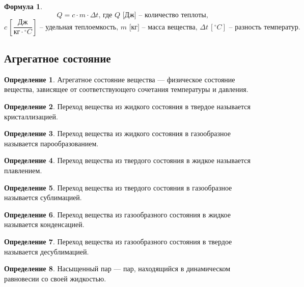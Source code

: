 \documentclass[12pt]{article}
\theoremstyle{definition}
\newtheorem{definition}{Определение}
\newtheorem{formula}[theorem]{Формула}
\begin{document}
\begin{formula}
    $$Q=c\cdot m\cdot \Delta t\text{, где }Q\text{ [Дж] – количество теплоты,}$$
$$c\,\left[\frac{\text{Дж}}{\text{кг}\cdot {^\circ C}}\right]\text{ – удельная теплоемкость, }m\text{ [кг] – масса вещества, }\Delta t\,[^\circ C]\text{ – разность температур.}$$
\end{formula}

\subsection{Агрегатное состояние}

\begin{definition}
    Агрегатное состояние вещества — физическое состояние вещества, зависящее от соответствующего сочетания температуры и давления.
\end{definition}
\begin{definition}
    Переход вещества из жидкого состояния в твердое называется кристаллизацией.
\end{definition}
\begin{definition}
    Переход вещества из жидкого состояния в газообразное называется парообразованием.
\end{definition}
\begin{definition}
    Переход вещества из твердого состояния в жидкое называется плавлением.
\end{definition}
\begin{definition}
    Переход вещества из твердого состояния в газообразное называется сублимацией.
\end{definition}
\begin{definition}
    Переход вещества из газообразного состояния в жидкое называется конденсацией.
\end{definition}
\begin{definition}
    Переход вещества из газообразного состояния в твердое называется десублимацией.
\end{definition}
\begin{definition}
    Насыщенный пар — пар, находящийся в динамическом равновесии со своей жидкостью.
\end{definition}
\end{document}
